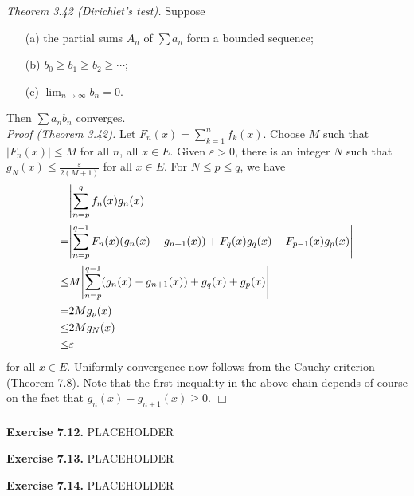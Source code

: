\documentclass{article}
\begin{document}
\emph{Theorem 3.42 (Dirichlet's test).}
Suppose
\begin{enumerate}
  \item[(a)]
  the partial sums $A_n$ of $\sum a_n$ form a bounded sequence;
  \item[(b)]
  $b_0 \geq b_1 \geq b_2 \geq \cdots$;
  \item[(c)]
  $\lim_{n \to \infty} b_n = 0$.
\end{enumerate}
Then $\sum a_n b_n$ converges. \\



\emph{Proof (Theorem 3.42).}
Let $F_n(x) = \sum_{k=1}^{n} f_k(x)$.
Choose $M$ such that $|F_n(x)| \leq M$ for all $n$, all $x \in E$.
Given $\varepsilon > 0$,
there is an integer $N$ such that $g_N(x) \leq \frac{\varepsilon}{2(M+1)}$ for all $x \in E$.
For $N \leq p \leq q$, we have
\begin{align*}
  &\abs{\sum_{n=p}^{q} f_n(x) g_n(x)} \\
  =& \abs{\sum_{n=p}^{q-1} F_n(x)(g_n(x)-g_{n+1}(x)) + F_q(x)g_q(x) - F_{p-1}(x)g_p(x)} \\
  \leq& M \abs{\sum_{n=p}^{q-1}(g_n(x)-g_{n+1}(x)) + g_q(x) + g_p(x)} \\
  =& 2M g_p(x) \\
  \leq& 2M g_N(x) \\
  \leq& \varepsilon
\end{align*}
for all $x \in E$.
Uniformly convergence now follows from the Cauchy criterion (Theorem 7.8).
Note that the first inequality in the above chain depends of course on the fact that
$g_n(x) - g_{n+1}(x) \geq 0$.
$\Box$ \\\\






\textbf{Exercise 7.12.}
PLACEHOLDER






\textbf{Exercise 7.13.}
PLACEHOLDER






\textbf{Exercise 7.14.}
PLACEHOLDER
\end{document}
